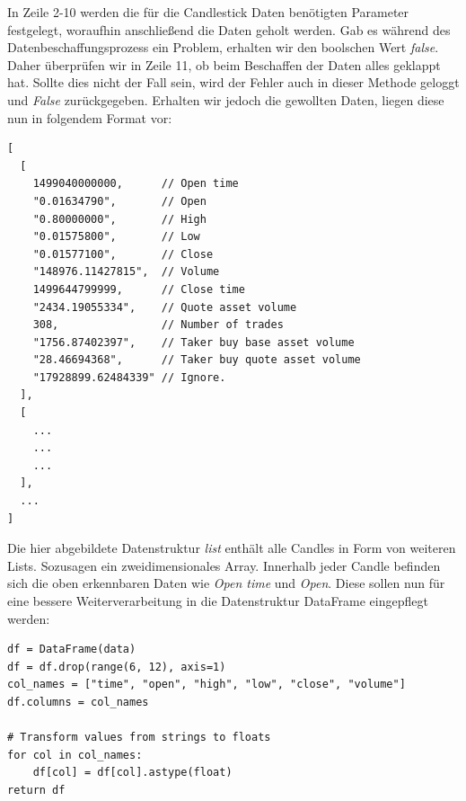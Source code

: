 \documentclass[oneside]{ausarbeitung}
\begin{document}
In Zeile 2-10 werden die für die Candlestick Daten benötigten Parameter festgelegt, woraufhin anschließend die Daten geholt werden. Gab es während des Datenbeschaffungsprozess ein Problem, erhalten wir den boolschen Wert \textit{false}. Daher überprüfen wir in Zeile 11, ob beim Beschaffen der Daten alles geklappt hat. Sollte dies nicht der Fall sein, wird der Fehler auch in dieser Methode geloggt und \textit{False} zurückgegeben. Erhalten wir jedoch die gewollten Daten, liegen diese nun in folgendem Format vor: \\

\lstset{language=Python}
\lstset{frame=lines}
\lstset{basicstyle=\footnotesize}
\begin{lstlisting}
[
  [
    1499040000000,      // Open time
    "0.01634790",       // Open
    "0.80000000",       // High
    "0.01575800",       // Low
    "0.01577100",       // Close
    "148976.11427815",  // Volume
    1499644799999,      // Close time
    "2434.19055334",    // Quote asset volume
    308,                // Number of trades
    "1756.87402397",    // Taker buy base asset volume
    "28.46694368",      // Taker buy quote asset volume
    "17928899.62484339" // Ignore.
  ],
  [
  	...
  	...
  	...
  ],
  ...
]
\end{lstlisting}

Die hier abgebildete Datenstruktur \textit{list} enthält alle Candles in Form von weiteren Lists. Sozusagen ein zweidimensionales Array. Innerhalb jeder Candle befinden sich die oben erkennbaren Daten wie \textit{Open time} und \textit{Open}. Diese sollen nun für eine bessere Weiterverarbeitung in die Datenstruktur DataFrame eingepflegt werden: \\

\lstset{language=Python}
\lstset{frame=lines}
\lstset{basicstyle=\footnotesize}
\begin{lstlisting}
df = DataFrame(data)
df = df.drop(range(6, 12), axis=1)
col_names = ["time", "open", "high", "low", "close", "volume"]
df.columns = col_names

# Transform values from strings to floats
for col in col_names:
	df[col] = df[col].astype(float)
return df
\end{lstlisting}
\end{document}
